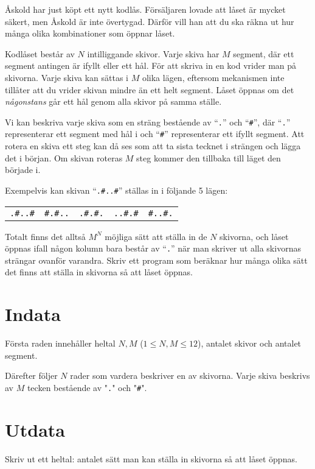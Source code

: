 Åskold har just köpt ett nytt kodlås.
Försäljaren lovade att låset är mycket säkert, men Åskold är inte övertygad.
Därför vill han att du ska räkna ut hur många olika kombinationer som öppnar låset.

Kodlåset består av $N$ intilliggande skivor.
Varje skiva har $M$ segment, där ett segment antingen är ifyllt eller ett hål.
För att skriva in en kod vrider man på skivorna.
Varje skiva kan sättas i $M$ olika lägen, eftersom mekanismen inte tillåter att du vrider skivan mindre än ett helt segment.
Låset öppnas om det \emph{någonstans} går ett hål genom alla skivor på samma ställe.

Vi kan beskriva varje skiva som en sträng bestående av ``\texttt{.}'' och ``\texttt{\#}'',
där ``\texttt{.}'' representerar ett segment med hål i och ``\texttt{\#}'' representerar ett ifyllt segment.
Att rotera en skiva ett steg kan då ses som att ta sista tecknet i strängen och lägga det i början.
Om skivan roteras $M$ steg kommer den tillbaka till läget den började i.

Exempelvis kan skivan ``\texttt{.\#..\#}'' ställas in i följande 5 lägen:

\begin{center}
  \begin{tabular}{c|c|c|c|c}
	{\centering \texttt{.\#..\#}} &
	{\centering \texttt{\#.\#..}} &
	{\centering \texttt{.\#.\#.}} &
	{\centering \texttt{..\#.\#}} &
	{\centering \texttt{\#..\#.}}
  \end{tabular}
\end{center}

Totalt finns det alltså $M^N$ möjliga sätt att ställa in de $N$ skivorna, och låset öppnas ifall någon kolumn bara består av ``\texttt{.}'' 
när man skriver ut alla skivornas strängar ovanför varandra. Skriv ett program som beräknar hur många olika sätt det finns att ställa in skivorna så att låset öppnas.

\section*{Indata}
Första raden innehåller heltal $N, M$ ($1\le N, M \le 12$), antalet skivor och antalet segment.

Därefter följer $N$ rader som vardera beskriver en av skivorna.
Varje skiva beskrivs av $M$ tecken bestående av "\texttt{.}" och "\texttt{\#}".

\section*{Utdata}
Skriv ut ett heltal: antalet sätt man kan ställa in skivorna så att låset öppnas.

